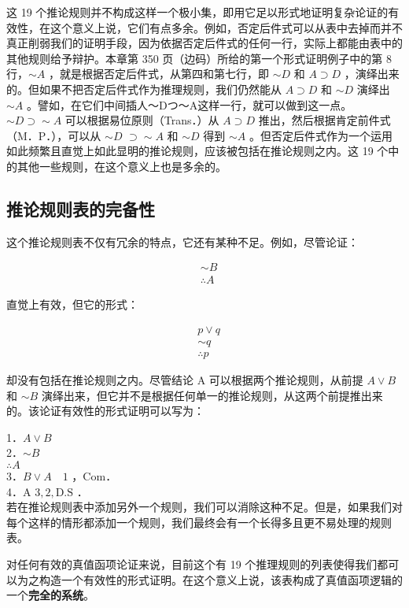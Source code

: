 这 19 个推论规则并不构成这样一个极小集，即用它足以形式地证明复杂论证的有效性，在这个意义上说，它们有点多余。例如，否定后件式可以从表中去掉而并不真正削弱我们的证明手段，因为依据否定后件式的任何一行，实际上都能由表中的其他规则给予辩护。本章第 350 页（边码）所给的第一个形式证明例子中的第 8 行，$\sim A$ ，就是根据否定后件式，从第四和第七行，即 $\sim D$ 和 $A \supset D$ ，演绎出来的。但如果不把否定后件式作为推理规则，我们仍然能从 $A \supset D$ 和 $\sim D$ 演绎出 $\sim A$ 。譬如，在它们中间插人～Dつ～A这样一行，就可以做到这一点。 $\sim D \supset \sim A$ 可以根据易位原则（Trans．）从 $A \supset D$ 推出，然后根据肯定前件式（M．P．），可以从 $\sim D$ $\supset \sim A$ 和 $\sim D$ 得到 $\sim A$ 。但否定后件式作为一个运用如此频繁且直觉上如此显明的推论规则，应该被包括在推论规则之内。这 19 个中的其他一些规则，在这个意义上也是多余的。

\subsection{推论规则表的完备性}

这个推论规则表不仅有冗余的特点，它还有某种不足。例如，尽管论证：

$$
\begin{aligned}
& \sim B \\
& \therefore A
\end{aligned}
$$

直觉上有效，但它的形式：

$$
\begin{aligned}
& p \vee q \\
& \sim q \\
& \therefore p
\end{aligned}
$$

却没有包括在推论规则之内。尽管结论 A 可以根据两个推论规则，从前提 $A \vee B$ 和 $\sim B$ 演绎出来，但它并不是根据任何单一的推论规则，从这两个前提推出来的。该论证有效性的形式证明可以写为：

1．$A \vee B$\\
2．$\sim B$\\
$\therefore A$\\
3．$B \vee A \quad 1$ ，Com．\\
4．A $3,2, \mathrm{D} . \mathrm{S}$ ．\\
若在推论规则表中添加另外一个规则，我们可以消除这种不足。但是，如果我们对每个这样的情形都添加一个规则，我们最终会有一个长得多且更不易处理的规则表。

对任何有效的真值函项论证来说，目前这个有 19 个推理规则的列表使得我们都可以为之构造一个有效性的形式证明。在这个意义上说，该表构成了真值函项逻辑的一个\textbf{完全的系统}。\cite{gentzen1935}

